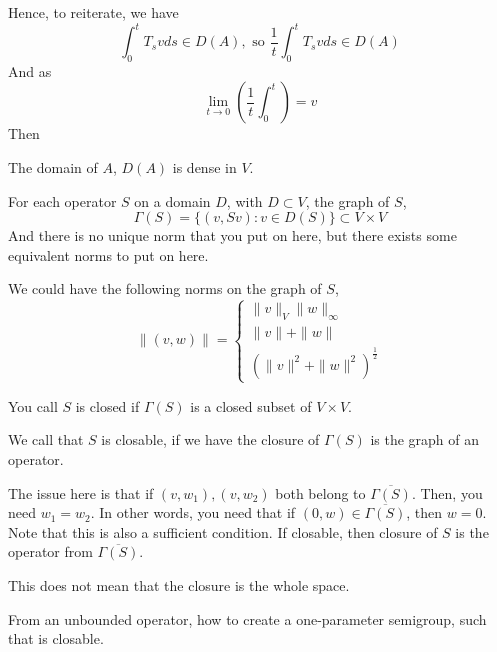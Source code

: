 Hence, to reiterate, we have
\begin{equation*}
    \int_0^t T_svds\in D(A), \text{ so }\frac{1}{t}\int_0^tT_svds\in D(A)
\end{equation*}
And as
\begin{equation*}
    \lim_{t\to 0}\left(\frac{1}{t}\int_0^t\right)=v
\end{equation*}
Then
\begin{proposition}
    The domain of $A$, $D(A)$ is dense in $V$.
\end{proposition}
For each operator $S$ on a domain $D$, with $D\subset V$, the graph of $S$,
\begin{equation*}
    \Gamma(S)=\{(v,Sv): v\in D(S)\}\subset V\times V
\end{equation*}
And there is no unique norm that you put on here, but there exists some equivalent norms to put on here.
\begin{example}
    We could have the following norms on the graph of $S$, 
    \begin{equation*}
        \|(v,w)\|=\begin{cases}
            \|v\|_V\|w\|_\infty\\
            \|v\|+\|w\|\\
            (\|v\|^2+\|w\|^2)^\frac{1}{2}
        \end{cases}
    \end{equation*}
\end{example}
\begin{definition}
    You call $S$ is closed if $\Gamma(S)$ is a closed subset of $V\times V$.

    We call that $S$ is closable, if we have the closure of $\Gamma(S)$ is the graph of an operator. 
\end{definition}
\begin{note}
    The issue here is that if $(v, w_1), (v,w_2)$ both belong to $\overline{\Gamma(S)}$. Then, you need $w_1=w_2$. In other words, you need that if $(0,w)\in\overline{\Gamma(S)}$, then $w=0$. Note that this is also a sufficient condition. If closable, then closure of $S$ is the operator from $\overline{\Gamma(S)}$.
\end{note}
\begin{remark}
    This does not mean that the closure is the whole space.
\end{remark}
From an unbounded operator, how to create a one-parameter semigroup, such that is closable.

